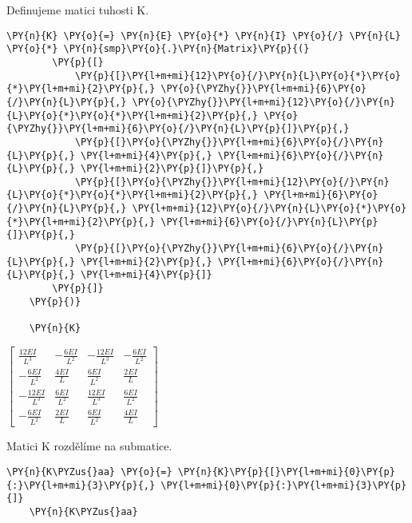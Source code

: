 Definujeme matici tuhosti \gls{K}.
\begin{tcolorbox}[breakable, size=fbox, boxrule=1pt, pad at break*=1mm,colback=cellbackground, colframe=cellborder]
    \begin{Verbatim}[commandchars=\\\{\}]
    \PY{n}{K} \PY{o}{=} \PY{n}{E} \PY{o}{*} \PY{n}{I} \PY{o}{/} \PY{n}{L} \PY{o}{*} \PY{n}{smp}\PY{o}{.}\PY{n}{Matrix}\PY{p}{(}
        \PY{p}{[}
            \PY{p}{[}\PY{l+m+mi}{12}\PY{o}{/}\PY{n}{L}\PY{o}{*}\PY{o}{*}\PY{l+m+mi}{2}\PY{p}{,} \PY{o}{\PYZhy{}}\PY{l+m+mi}{6}\PY{o}{/}\PY{n}{L}\PY{p}{,} \PY{o}{\PYZhy{}}\PY{l+m+mi}{12}\PY{o}{/}\PY{n}{L}\PY{o}{*}\PY{o}{*}\PY{l+m+mi}{2}\PY{p}{,} \PY{o}{\PYZhy{}}\PY{l+m+mi}{6}\PY{o}{/}\PY{n}{L}\PY{p}{]}\PY{p}{,}
            \PY{p}{[}\PY{o}{\PYZhy{}}\PY{l+m+mi}{6}\PY{o}{/}\PY{n}{L}\PY{p}{,} \PY{l+m+mi}{4}\PY{p}{,} \PY{l+m+mi}{6}\PY{o}{/}\PY{n}{L}\PY{p}{,} \PY{l+m+mi}{2}\PY{p}{]}\PY{p}{,}
            \PY{p}{[}\PY{o}{\PYZhy{}}\PY{l+m+mi}{12}\PY{o}{/}\PY{n}{L}\PY{o}{*}\PY{o}{*}\PY{l+m+mi}{2}\PY{p}{,} \PY{l+m+mi}{6}\PY{o}{/}\PY{n}{L}\PY{p}{,} \PY{l+m+mi}{12}\PY{o}{/}\PY{n}{L}\PY{o}{*}\PY{o}{*}\PY{l+m+mi}{2}\PY{p}{,} \PY{l+m+mi}{6}\PY{o}{/}\PY{n}{L}\PY{p}{]}\PY{p}{,}
            \PY{p}{[}\PY{o}{\PYZhy{}}\PY{l+m+mi}{6}\PY{o}{/}\PY{n}{L}\PY{p}{,} \PY{l+m+mi}{2}\PY{p}{,} \PY{l+m+mi}{6}\PY{o}{/}\PY{n}{L}\PY{p}{,} \PY{l+m+mi}{4}\PY{p}{]}
        \PY{p}{]}
    \PY{p}{)}
    
    \PY{n}{K}
    \end{Verbatim}
\end{tcolorbox}
     
                
    
    $\displaystyle \left[\begin{matrix}\frac{12 E I}{L^{3}} & - \frac{6 E I}{L^{2}} & - \frac{12 E I}{L^{3}} & - \frac{6 E I}{L^{2}}\\- \frac{6 E I}{L^{2}} & \frac{4 E I}{L} & \frac{6 E I}{L^{2}} & \frac{2 E I}{L}\\- \frac{12 E I}{L^{3}} & \frac{6 E I}{L^{2}} & \frac{12 E I}{L^{3}} & \frac{6 E I}{L^{2}}\\- \frac{6 E I}{L^{2}} & \frac{2 E I}{L} & \frac{6 E I}{L^{2}} & \frac{4 E I}{L}\end{matrix}\right]$
    
        
\vspace{0.3cm}
Matici \gls{K} rozdělíme na submatice.   
\begin{tcolorbox}[breakable, size=fbox, boxrule=1pt, pad at break*=1mm,colback=cellbackground, colframe=cellborder]
    \begin{Verbatim}[commandchars=\\\{\}]
    \PY{n}{K\PYZus{}aa} \PY{o}{=} \PY{n}{K}\PY{p}{[}\PY{l+m+mi}{0}\PY{p}{:}\PY{l+m+mi}{3}\PY{p}{,} \PY{l+m+mi}{0}\PY{p}{:}\PY{l+m+mi}{3}\PY{p}{]}
    \PY{n}{K\PYZus{}aa}
    \end{Verbatim}
\end{tcolorbox}
     

